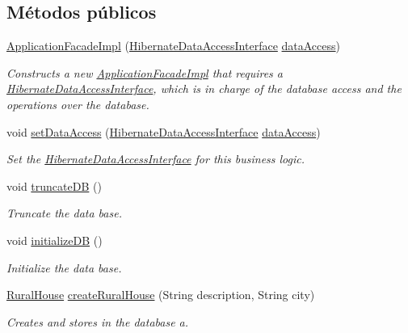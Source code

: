 \subsection*{Métodos públicos}
\begin{DoxyCompactItemize}
\item 
\mbox{\hyperlink{a00132_ad6ed360c754c5ba82a2b88bb4cf036f7}{Application\+Facade\+Impl}} (\mbox{\hyperlink{a00148}{Hibernate\+Data\+Access\+Interface}} \mbox{\hyperlink{a00132_a96ac80fe606a4649e5fbbbd24935690a}{data\+Access}})
\begin{DoxyCompactList}\small\item\em Constructs a new \mbox{\hyperlink{a00132}{Application\+Facade\+Impl}} that requires a \mbox{\hyperlink{}{Hibernate\+Data\+Access\+Interface}}, which is in charge of the database access and the operations over the database. \end{DoxyCompactList}\item 
void \mbox{\hyperlink{a00132_a78fc6968b9fec7aa475b322463b6bd92}{set\+Data\+Access}} (\mbox{\hyperlink{a00148}{Hibernate\+Data\+Access\+Interface}} \mbox{\hyperlink{a00132_a96ac80fe606a4649e5fbbbd24935690a}{data\+Access}})
\begin{DoxyCompactList}\small\item\em Set the \mbox{\hyperlink{}{Hibernate\+Data\+Access\+Interface}} for this business logic. \end{DoxyCompactList}\item 
void \mbox{\hyperlink{a00132_a5fe9f44c95b3459fb8999c26e5b934cb}{truncate\+DB}} ()
\begin{DoxyCompactList}\small\item\em Truncate the data base. \end{DoxyCompactList}\item 
void \mbox{\hyperlink{a00132_a1e6cbb70c9568899c86135b3264b431d}{initialize\+DB}} ()
\begin{DoxyCompactList}\small\item\em Initialize the data base. \end{DoxyCompactList}\item 
\mbox{\hyperlink{a00188}{Rural\+House}} \mbox{\hyperlink{a00132_a48b82f812a30271878f50b99ae16a24b}{create\+Rural\+House}} (String description, String city)
\begin{DoxyCompactList}\small\item\em Creates and stores in the database a. \end{DoxyCompactList}\item 

\end{DoxyCompactItemize}
